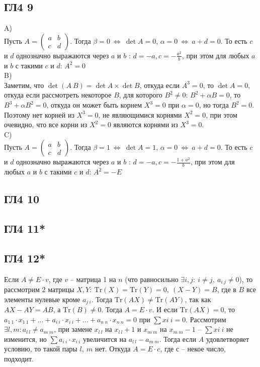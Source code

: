 		\subsection{ГЛ4 9}
		A)\\
		Пусть $A = \begin{pmatrix} a & b\\ c & d \end{pmatrix}$. Тогда $\beta = 0\ \Leftrightarrow \ \det A = 0$, $\alpha = 0\ \Leftrightarrow \ a + d = 0$. То есть $c$ и $d$ однозначно выражаются через $a$ и $b$ : $d = -a, c = - \frac{a^2}{b}$, при этом для любых $a$ и $b$ с такими $c$ и $d$: $A^2 = 0$
		\\
		B)\\
		Заметим, что $\det (A\ B) = \det A \times \det B$, откуда если $A^3 = 0$, то $\det A = 0$, откуда если рассмотреть некоторое $B$, для которого $B^2 \ne 0$: $B^2 + \alpha B = 0$, то $B^3 + \alpha B^2 = 0$, откуда он может быть корнем $X^3 = 0$ при $\alpha = 0$, но тогда $B^2 = 0$. Поэтому нет корней из $X^3 = 0$, не являющимися корнями $X^2 = 0$, при этом очевидно, что все корни из $X^2 = 0$ являются корнями из $X^3 = 0$.
		\\
		C)\\
		Пусть $A = \begin{pmatrix} a & b\\ c & d \end{pmatrix}$. Тогда $\beta = 1\ \Leftrightarrow \ \det A = 1$, $\alpha = 0\ \Leftrightarrow \ a + d = 0$. То есть $c$ и $d$ однозначно выражаются через $a$ и $b$ : $d = -a, c = - \frac{1 + a^2}{b}$, при этом для любых $a$ и $b$ с такими $c$ и $d$: $A^2 = -E$
		
		\subsection{ГЛ4 10}
		
		\subsection{ГЛ4 11*}
		
		\subsection{ГЛ4 12*}
		Если $A \ne E \cdot v$, где $v$ -- матрица 1 на $n$ (что равносильно $\exists i,j:\ i \ne j,\ a_{i\ j} \ne 0$), то рассмотрим 2 матрицы $X,Y:\ \text{Tr}(X) = \text{Tr}(Y) = 0,\ (X - Y) = B$, где в $B$ все элементы нулевые кроме $a_{j\ i}$. Тогда $\text{Tr}(AX) \ne \text{Tr}(AY)$, так как $AX - AY = AB$, а $\text{Tr}(B) \ne 0$. Тогда $A = E \cdot v$. И если $\text{Tr}(AX) = 0$, то $a_{1\ 1} \cdot x_{1\ 1} + ... + a_{i\ i}  \cdot  x_{i\ i} + ... + a_{n\ n} \cdot x_{n\ n} = 0$ при $\sum x{i\ i} = 0$. Рассмотрим $\exists l,m: a_{l\ l} \ne a_{m\ m}$, при замене $x_{l\ l}$ на $x_{l\ l} + 1$ и $x_{m\ m}$ на $x_{m\ m} - 1$ -- $\sum x{i\ i}$ не изменится, но $\sum a_{i\ i} \cdot x_{i\ i}$ увеличится на $a_{l\ l} - a_{m\ m}$. Тогда если $A$ удовлетворяет условию, то такой пары $l,\ m$ нет. Откуда $A = E \cdot c$, где $с$ -- некое число, подходит.
		